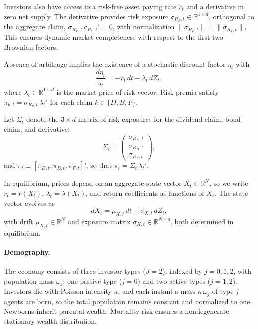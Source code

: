 \documentclass[12pt,english]{article}
\begin{document}
Investors also have access to a risk-free asset paying rate $r_t$ and a derivative in zero net supply. The derivative provides risk exposure $\sigma_{R_F,t} \in \mathbb{R}^{1\times d}$, orthogonal to the aggregate claim, $\sigma_{R_F,t}\,\sigma_{R_Y,t}' = 0$, with normalization $\|\sigma_{R_F,t}\| = \|\sigma_{R_Y,t}\|$. This ensures dynamic market completeness with respect to the first two Brownian factors.

Absence of arbitrage implies the existence of a stochastic discount factor $\eta_t$ with
\begin{equation}
    \frac{d\eta_t}{\eta_t} = -r_t\,dt - \lambda_t\,dZ_t,
\end{equation}
where $\lambda_t \in \mathbb{R}^{1\times d}$ is the market price of risk vector. Risk premia satisfy $\pi_{k,t} = \sigma_{R_k,t}\,\lambda_t'$ for each claim $k \in \{D,B,F\}$.

Let $\Sigma_t$ denote the $3 \times d$ matrix of risk exposures for the dividend claim, bond claim, and derivative:
\begin{equation}
    \Sigma_t = \begin{pmatrix}
        \sigma_{R_D,t} \\
        \sigma_{R_B,t} \\
        \sigma_{R_F,t}
    \end{pmatrix},
\end{equation}
and $\pi_t \equiv [\pi_{D,t}, \pi_{B,t}, \pi_{F,t}]'$, so that $\pi_t = \Sigma_t\,\lambda_t'$.

In equilibrium, prices depend on an aggregate state vector $X_t \in \mathbb{R}^N$, so we write $r_t = r(X_t)$, $\lambda_t = \lambda(X_t)$, and return coefficients as functions of $X_t$. The state vector evolves as
\begin{equation}\label{eq:state_dynamics}
    dX_t = \mu_{X,t}\,dt + \sigma_{X,t}\,dZ_t,
\end{equation}
with drift $\mu_{X,t} \in \mathbb{R}^N$ and exposure matrix $\sigma_{X,t} \in \mathbb{R}^{N\times d}$, both determined in equilibrium.


\paragraph{Demography.}

The economy consists of three investor types ($J=2$), indexed by $j=0,1,2$, with population mass $\omega_j$: one passive type ($j=0$) and two active types ($j=1,2$). Investors die with Poisson intensity $\kappa$, and each instant a mass $\kappa\,\omega_j$ of type-$j$ agents are born, so the total population remains constant and normalized to one. Newborns inherit parental wealth. 
Mortality risk ensures a nondegenerate stationary wealth distribution.
\end{document}
